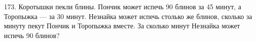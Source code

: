 173. Коротышки пекли блины. Пончик может испечь 90 блинов за 45 минут, а Торопыжка --- за 30 минут. Незнайка может испечь столько же блинов, сколько за минуту пекут Пончик и Торопыжка вместе. За сколько минут Незнайка может испечь 90 блинов?\\
